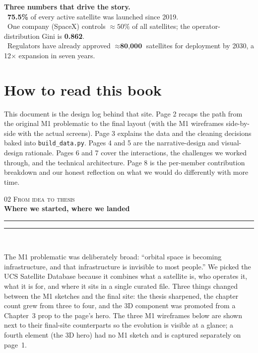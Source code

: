 \documentclass[9pt,a4paper]{article}
\newcommand{\eyebrow}[1]{{\footnotesize\textcolor{accentBlue}{\textsc{#1}}}}
\newcommand{\pageheader}[3]{%
  {\eyebrow{#1 \quad\textbullet\quad #2}}\\[3pt]%
  {\Large\bfseries #3}\\[3pt]%
  {\color{accentBlue}\rule{4em}{1.5pt}}\hspace{1pt}%
  {\color{accentBlue!28}\rule{\dimexpr\linewidth-4em-1pt\relax}{0.5pt}}\\[4pt]%
}
\begin{document}
\begin{tcolorbox}[colback=cardBg!92!black, colframe=accentBlue!60!black, boxrule=0.4pt, arc=2pt, left=8pt, right=8pt, top=4pt, bottom=4pt]
\color{white}\small\textbf{Three numbers that drive the story.}\\[2pt]
\textbullet\ \textbf{75.5\%} of every active satellite was launched since 2019. \\[1pt]
\textbullet\ One company (SpaceX) controls \textbf{$\approx 50\%$} of all satellites; the operator-distribution Gini is \textbf{0.862}. \\[1pt]
\textbullet\ Regulators have already approved $\approx \textbf{80{,}000}$ satellites for deployment by 2030, a 12$\times$ expansion in seven years.
\end{tcolorbox}

\vspace{6pt}

\section*{How to read this book}

This document is the design log behind that site. Page 2 recaps the path from the original M1 problematic to the final layout (with the M1 wireframes side-by-side with the actual screens). Page 3 explains the data and the cleaning decisions baked into \texttt{build\_data.py}. Pages 4 and 5 are the narrative-design and visual-design rationale. Pages 6 and 7 cover the interactions, the challenges we worked through, and the technical architecture. Page 8 is the per-member contribution breakdown and our honest reflection on what we would do differently with more time.

\vspace{18pt}


\pageheader{02}{From idea to thesis}{Where we started, where we landed}

\vspace{2pt}

The M1 problematic was deliberately broad: ``orbital space is becoming infrastructure, and that infrastructure is invisible to most people.'' We picked the UCS Satellite Database because it combines what a satellite is, who operates it, what it is for, and where it sits in a single curated file. Three things changed between the M1 sketches and the final site: the thesis sharpened, the chapter count grew from three to four, and the 3D component was promoted from a Chapter~3 prop to the page's hero. The three M1 wireframes below are shown next to their final-site counterparts so the evolution is visible at a glance; a fourth element (the 3D hero) had no M1 sketch and is captured separately on page~1.
\end{document}
